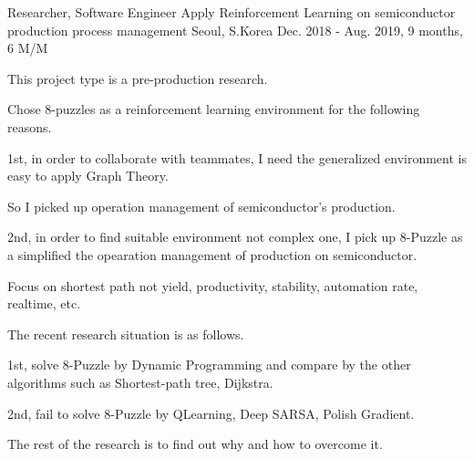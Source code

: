 \begin{cventries}
  \cventry
    {Researcher, Software Engineer} %
    {Apply Reinforcement Learning on semiconductor production process management} %
    {Seoul, S.Korea} %
    {Dec. 2018 - Aug. 2019, 9 months, 6 M/M} %
    {
      \begin{cvitems} %
        \item {This project type is a pre-production research.}
        \item {Chose 8-puzzles as a reinforcement learning environment for the following reasons.}
        \item {1st, in order to collaborate with teammates, I need the generalized environment is easy to apply Graph Theory.}
        \item {So I picked up operation management of semiconductor's production.}
        \item {2nd, in order to find suitable environment not complex one, I pick up 8-Puzzle as a simplified the opearation management of production on semiconductor.}
        \item {Focus on shortest path not yield, productivity, stability, automation rate, realtime, etc.}
        \item {The recent research situation is as follows.}
        \item {1st, solve 8-Puzzle by Dynamic Programming and compare by the other algorithms such as Shortest-path tree, Dijkstra.}
        \item {2nd, fail to solve 8-Puzzle by QLearning, Deep SARSA, Polish Gradient.}
        \item {The rest of the research is to find out why and how to overcome it.}
      \end{cvitems}
    }


\end{cventries}
